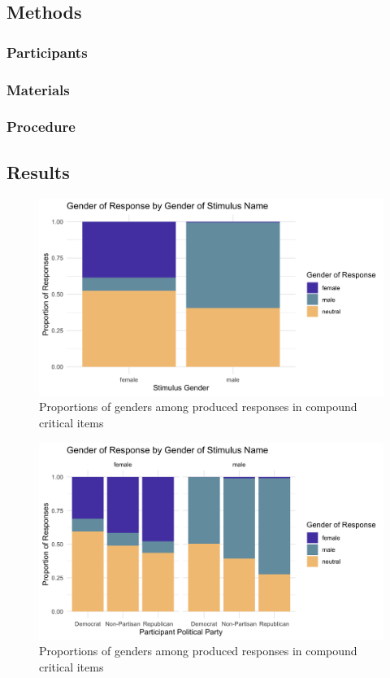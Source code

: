 \documentclass{article}
\begin{document}
	\subsection{Methods}
	
	\subsubsection{Participants}
	
	\subsubsection{Materials}
	
	\subsubsection{Procedure}
	
	\subsection{Results}
	
	\begin{figure}[h!]
		\centering
		\includegraphics[scale=0.2]{prod_results_cumulative.png}
		\caption{Proportions of genders among produced responses in compound critical items}
	\end{figure}

	\begin{figure}[h!]
	\centering
	\includegraphics[scale=0.2]{prod_comp_party.png}
	\caption{Proportions of genders among produced responses in compound critical items}
	\end{figure}
\end{document}
